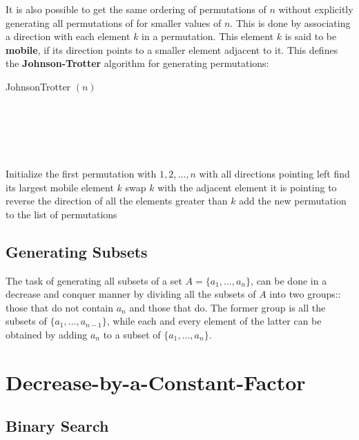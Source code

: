 \documentclass[12pt letter]{report}
\begin{document}
It is also possible to get the same ordering of permutations of $n$ without explicitly generating all permutations of
for smaller values of $n$. This is done by associating a direction with each element $k$ in a permutation. This element
$k$ is said to be \textbf{mobile}, if its direction points to a smaller element adjacent to it. This defines the
\textbf{Johnson-Trotter} algorithm for generating permutations:
\begin{algorithm}[H]
  \caption{JohnsonTrotter $ \left( n \right) $}
  \Comment{}\\
   \\
   \\
   \\
  \begin{algorithmic}[1]
    \State Initialize the first permutation with $1, 2, \ldots, n$ with all directions pointing left
    \State find its largest mobile element $k$
    \State swap $k$ with the adjacent element it is pointing to
    \State reverse the direction of all the elements greater than $k$
    \State add the new permutation to the list of permutations
    \EndWhile
  \end{algorithmic}
\end{algorithm}

\section{Generating Subsets}

The task of generating all subsets of a set $A = \{a_1, \ldots, a_n\} $, can be done in a decrease and conquer manner by
dividing all the subsets of $A$ into two groups:: those that do not contain $a_n$ and those that do. The former group is
all the subsets of $\{a_1, \ldots, a_{n-1}\} $, while each and every element of the latter can be obtained by adding
$a_n$ to a subset of $\{a_1, \ldots, a_n\} $.

\chapter{Decrease-by-a-Constant-Factor}

\section{Binary Search}
\end{document}

